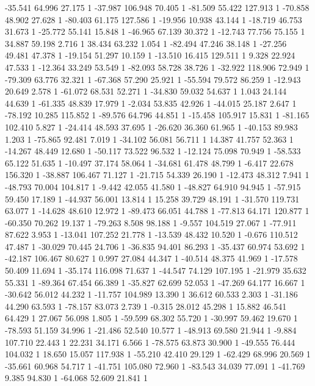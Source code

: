 	-35.541 64.996 27.175 1
	-37.987 106.948 70.405 1
	-81.509 55.422 127.913 1
	-70.858 48.902 27.628 1
	-80.403 61.175 127.586 1
	-19.956 10.938 43.144 1
	-18.719 46.753 31.673 1
	-25.772 55.141 15.848 1
	-46.965 67.139 30.372 1
	-12.743 77.756 75.155 1
	34.887 59.198 2.716 1
	38.434 63.232 1.054 1
	-82.494 47.246 38.148 1
	-27.256 49.481 47.378 1
	-19.154 51.297 10.159 1
	-13.510 16.415 129.511 1
	9.328 22.924 47.533 1
	-12.364 33.249 53.549 1
	-82.093 58.728 38.726 1
	-32.922 118.906 72.949 1
	-79.309 63.776 32.321 1
	-67.368 57.290 25.921 1
	-55.594 79.572 86.259 1
	-12.943 20.649 2.578 1
	-61.072 68.531 52.271 1
	-34.830 59.032 54.637 1
	1.043 24.144 44.639 1
	-61.335 48.839 17.979 1
	-2.034 53.835 42.926 1
	-44.015 25.187 2.647 1
	-78.192 10.285 115.852 1
	-89.576 64.796 44.851 1
	-15.458 105.917 15.831 1
	-81.165 102.410 5.827 1
	-24.414 48.593 37.695 1
	-26.620 36.360 61.965 1
	-40.153 89.983 1.203 1
	-75.865 92.481 7.019 1
	-34.102 56.081 56.711 1
	14.387 41.757 52.363 1
	-14.267 48.449 12.680 1
	-50.117 73.522 96.532 1
	-12.124 75.098 70.949 1
	-58.533 65.122 51.635 1
	-10.497 37.174 58.064 1
	-34.681 61.478 48.799 1
	-6.417 22.678 156.320 1
	-38.887 106.467 71.127 1
	-21.715 54.339 26.190 1
	-12.473 48.312 7.941 1
	-48.793 70.004 104.817 1
	-9.442 42.055 41.580 1
	-48.827 64.910 94.945 1
	-57.915 59.450 17.189 1
	-44.937 56.001 13.814 1
	15.258 39.729 48.191 1
	-31.570 119.731 63.077 1
	-14.628 48.610 12.972 1
	-89.473 66.051 44.788 1
	-77.813 64.171 120.877 1
	-60.350 70.262 19.137 1
	-79.263 8.508 98.188 1
	-9.557 104.519 27.067 1
	-77.911 87.622 3.953 1
	-13.041 107.252 21.778 1
	-13.539 48.432 10.520 1
	-0.676 110.512 47.487 1
	-30.029 70.445 24.706 1
	-36.835 94.401 86.293 1
	-35.437 60.974 53.692 1
	-42.187 106.467 80.627 1
	0.997 27.084 44.347 1
	-40.514 48.375 41.969 1
	-17.578 50.409 11.694 1
	-35.174 116.098 71.637 1
	-44.547 74.129 107.195 1
	-21.979 35.632 55.331 1
	-89.364 67.454 66.389 1
	-35.827 62.699 52.053 1
	-47.269 64.177 16.667 1
	-30.642 56.012 44.232 1
	-11.757 104.989 13.390 1
	36.612 60.533 2.303 1
	-31.186 44.290 63.593 1
	-78.157 83.073 2.739 1
	-0.315 28.012 45.298 1
	15.882 46.541 64.429 1
	27.067 56.098 1.805 1
	-59.599 68.302 55.720 1
	-30.997 59.462 19.670 1
	-78.593 51.159 34.996 1
	-21.486 52.540 10.577 1
	-48.913 69.580 21.944 1
	-9.884 107.710 22.443 1
	22.231 34.171 6.566 1
	-78.575 63.873 30.900 1
	-49.555 76.444 104.032 1
	18.650 15.057 117.938 1
	-55.210 42.410 29.129 1
	-62.429 68.996 20.569 1
	-35.661 60.968 54.717 1
	-41.751 105.080 72.960 1
	-83.543 34.039 77.091 1
	-41.769 9.385 94.830 1
	-64.068 52.609 21.841 1
